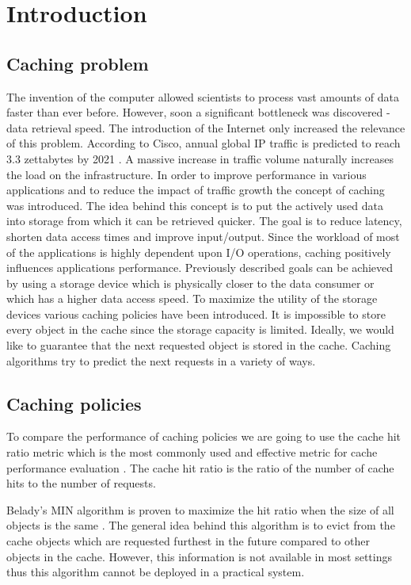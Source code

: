 \section{Introduction} \label{introduction}
\subsection{Caching problem} \label{caching_problem}

The invention of the computer allowed scientists to process vast amounts of data faster than ever before. However, soon a significant bottleneck was discovered - data retrieval speed. The introduction of the Internet only increased the relevance of this problem. According to Cisco, annual global IP traffic is predicted to reach 3.3 zettabytes by 2021 \cite{1}. A massive increase in traffic volume naturally increases the load on the infrastructure. In order to improve performance in various applications and to reduce the impact of traffic growth the concept of caching was introduced. The idea behind this concept is to put the actively used data into storage from which it can be retrieved quicker. The goal is to reduce latency, shorten data access times and improve input/output. Since the workload of most of the applications is highly dependent upon I/O operations, caching positively influences applications performance. Previously described goals can be achieved by using a storage device which is physically closer to the data consumer or which has a higher data access speed. To maximize the utility of the storage devices various caching policies have been introduced. It is impossible to store every object in the cache since the storage capacity is limited. Ideally, we would like to guarantee that the next requested object is stored in the cache. Caching algorithms try to predict the next requests in a variety of ways.

\subsection{Caching policies} \label{caching_policies}

To compare the performance of caching policies we are going to use the cache hit ratio metric which is the most commonly used and effective metric for cache performance evaluation \cite{5}. The cache hit ratio is the ratio of the number of cache hits to the number of requests.

Belady's MIN algorithm is proven to maximize the hit ratio when the size of all objects is the same \cite{2}. The general idea behind this algorithm is to evict from the cache objects which are requested furthest in the future compared to other objects in the cache. However, this information is not available in most settings thus this algorithm cannot be deployed in a practical system.

